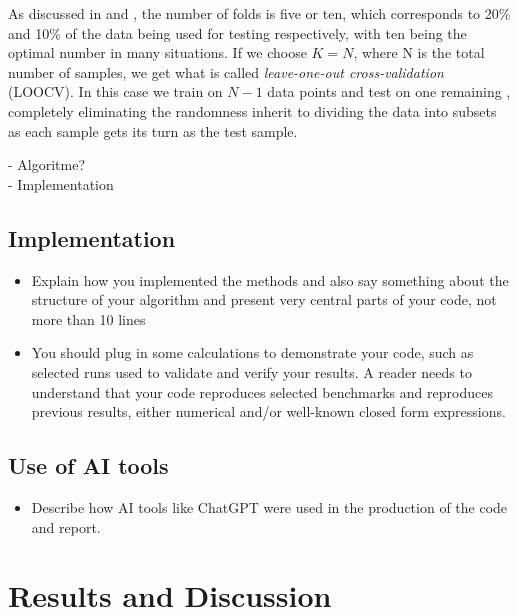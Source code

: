 \documentclass[amssymb,twocolumn,aps]{revtex4}
\begin{document}
As discussed in \cite{Hastie-et-al-2009} and \cite{Raschka-et-al-2022}, the number of folds is five or ten, which corresponds to 20\% and 10\% of the data being used for testing respectively, with ten being the optimal number in many situations. If we choose $K = N$, where N is the total number of samples, we get what is called \textit{leave-one-out cross-validation} (LOOCV). In this case we train on $N - 1$ data points and test on one remaining \cite{Raschka-et-al-2022}, completely eliminating the randomness inherit to dividing the data into subsets as each sample gets its turn as the test sample.


- Algoritme?\\

- Implementation

\subsection{Implementation}

\begin{itemize}
    \item Explain how you implemented the methods and also say something about the structure of your algorithm and present very central parts of your code, not more than 10 lines
    \item You should plug in some calculations to demonstrate your code, such as selected runs used to validate and verify your results. A reader needs to understand that your code reproduces selected benchmarks and reproduces previous results, either numerical and/or well-known closed form expressions.
\end{itemize}

\subsection{Use of AI tools}
	
\begin{itemize}
    \item Describe how AI tools like ChatGPT were used in the production of the code and report.
\end{itemize}





	
\section{Results and Discussion}\label{section:results} 
\end{document}
